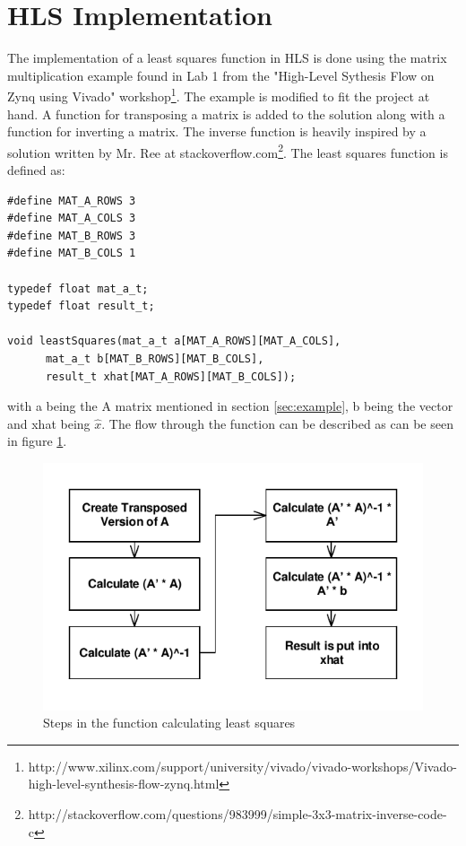 \section{HLS Implementation}
The implementation of a least squares function in HLS is done using the matrix multiplication example found in Lab 1 from the "High-Level Sythesis Flow on Zynq using Vivado" workshop\footnote{http://www.xilinx.com/support/university/vivado/vivado-workshops/Vivado-high-level-synthesis-flow-zynq.html}. The example is modified to fit the project at hand. A function for transposing a matrix is added to the solution along with a function for inverting a matrix. The inverse function is heavily inspired by a solution written by Mr. Ree at stackoverflow.com\footnote{http://stackoverflow.com/questions/983999/simple-3x3-matrix-inverse-code-c}.
The least squares function is defined as:
\begin{lstlisting}
#define MAT_A_ROWS 3
#define MAT_A_COLS 3
#define MAT_B_ROWS 3
#define MAT_B_COLS 1

typedef float mat_a_t;
typedef float result_t;

void leastSquares(mat_a_t a[MAT_A_ROWS][MAT_A_COLS],
      mat_a_t b[MAT_B_ROWS][MAT_B_COLS],
      result_t xhat[MAT_A_ROWS][MAT_B_COLS]);
\end{lstlisting}
with a being the A matrix mentioned in section \ref{sec:example}, b being the vector and xhat being $\hat{x}$. The flow through the function can be described as can be seen in figure \ref{fig:LSFunc}.
\begin{figure}[H]
\centering
\includegraphics[scale=1]{billeder/leastSquaresFunc}
\caption{Steps in the function calculating least squares}
\label{fig:LSFunc}
\end{figure}
